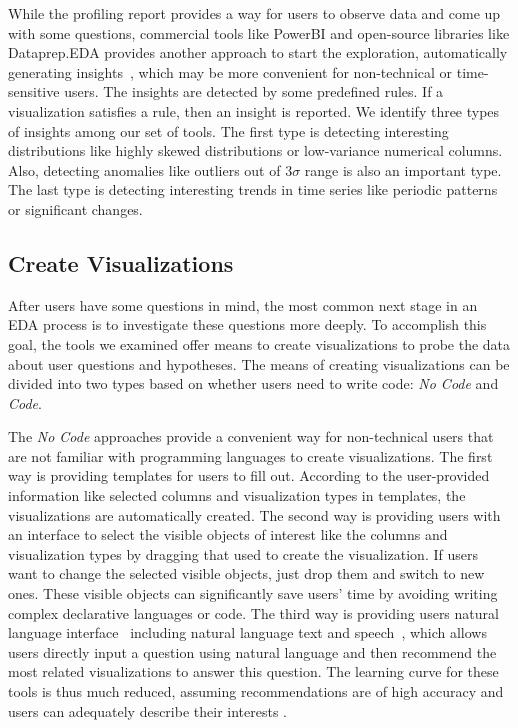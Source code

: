 \documentclass[11pt]{article}
\newcommand{\stitle}[1]{ \noindent{\bf #1.\xspace}}
\begin{document}
\stitle{Auto Insight} While the profiling report provides a way for users to observe data and come up with some questions, commercial tools like PowerBI and open-source libraries like Dataprep.EDA provides another approach to start the exploration, automatically generating insights~\cite{DBLP:conf/sigmod/DingHXZZ19}, which may be more convenient for non-technical or time-sensitive users. The insights are detected by some predefined rules. If a visualization satisfies a rule, then an insight is reported. We identify three types of insights among our set of tools. The first type is detecting interesting distributions like highly skewed distributions or low-variance numerical columns. Also, detecting anomalies like outliers out of $3\sigma$ range is also an important type. The last type is detecting interesting trends in time series like periodic patterns or significant changes.


\subsection{Create Visualizations}\label{sec:create-vis}
After users have some questions in mind, the most common next stage in an EDA process is to investigate these questions more deeply. To accomplish this goal, the tools we examined offer means to create visualizations to probe the data about user questions and hypotheses. The means of creating visualizations can be divided into two types based on whether users need to write code: \emph{No Code} and \emph{Code}.

\stitle{No Code} The \emph{No Code} approaches provide a convenient way for non-technical users that are not familiar with programming languages to create visualizations. The first way is providing templates for users to fill out. According to the user-provided information like selected columns and visualization types in templates, the visualizations are automatically created. The second way is providing users with an interface to select the visible objects of interest \cite{drag-and-drop} like the columns and visualization types by dragging that used to create the visualization. If users want to change the selected visible objects, just drop them and switch to new ones. These visible objects can significantly save users' time by avoiding writing complex declarative languages or code. %
The third way is providing users natural language interface~\cite{DBLP:conf/uist/SetlurBTGC16} including natural language text and speech~\cite{speech-to-vis}, which allows users directly input a question using natural language and then recommend the most related visualizations to answer this question. The learning curve for these tools is thus much reduced, assuming recommendations are of high accuracy and users can adequately describe their interests \cite{nlpSurvey}.
\end{document}
